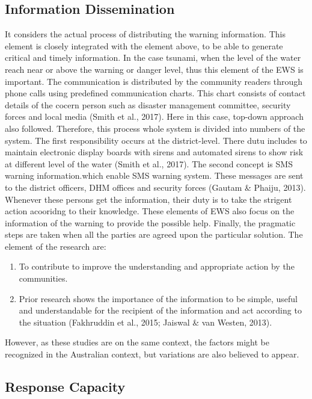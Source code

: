 \subsection{Information Dissemination }\label{information_dissemination}
It considers the actual process of distributing the warning information. This element is closely integrated with the element above, to be able to generate critical and timely information.  In the case tsunami,  when the level of the water reach near or above the warning or danger level, thus this element of the EWS is important.  The communication is distributed by the community readers through phone calls using predefined communication charts. This chart consists of contact details of the cocern person such as  disaster management committee, security forces and local media (Smith et al., 2017).  Here in this case, top-down approach also followed.  Therefore, this process whole system is divided into numbers of the system. The first responsibility occurs at the district-level.  There dutu includes to maintain electronic display boards with sirens  and automated sirens to show risk at different level of the water (Smith et al., 2017). The second concept is SMS warning information.which enable SMS warning system. These messages are sent to the district officers, DHM offices  and security forces (Gautam & Phaiju, 2013). Whenever these persons get the information, their duty is to take the strigent action acooridng to their knowledge.  These elements of EWS also focus on the information of the warning to provide the possible help. Finally, the pragmatic steps are taken when all the parties are agreed upon the particular solution.  The element of the research are:
\begin{enumerate}
\item To contribute to improve the understanding and appropriate action by the communities. 
\item Prior research shows the importance of the information to be simple, useful and understandable for the recipient of the information and act according to the situation (Fakhruddin et al., 2015; Jaiswal & van Westen, 2013).
\end{enumerate} 
However, as these studies are on the same context, the factors might be recognized in the Australian  context, but variations are also believed to appear. 
\subsection{Response Capacity}\label{response_capacity}

